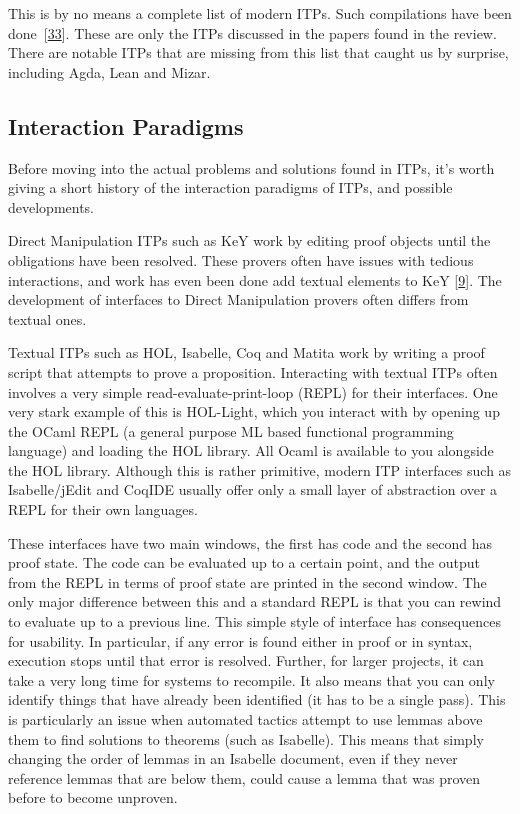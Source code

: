 \documentclass[
]{article}
\begin{document}
This is by no means a complete list of modern ITPs. Such compilations
have been done~{[}\protect\hyperlink{ref-nawaz_survey_2019}{33}{]}.
These are only the ITPs discussed in the papers found in the review.
There are notable ITPs that are missing from this list that caught us by
surprise, including Agda, Lean and Mizar.

\hypertarget{interaction-paradigms}{%
\subsection{Interaction Paradigms}\label{interaction-paradigms}}

Before moving into the actual problems and solutions found in ITPs, it's
worth giving a short history of the interaction paradigms of ITPs, and
possible developments.

Direct Manipulation ITPs such as KeY work by editing proof objects until
the obligations have been resolved. These provers often have issues with
tedious interactions, and work has even been done add textual elements
to KeY {[}\protect\hyperlink{ref-beckert_interaction_2017}{9}{]}. The
development of interfaces to Direct Manipulation provers often differs
from textual ones.

Textual ITPs such as HOL, Isabelle, Coq and Matita work by writing a
proof script that attempts to prove a proposition. Interacting with
textual ITPs often involves a very simple read-evaluate-print-loop
(REPL) for their interfaces. One very stark example of this is
HOL-Light, which you interact with by opening up the OCaml REPL (a
general purpose ML based functional programming language) and loading
the HOL library. All Ocaml is available to you alongside the HOL
library. Although this is rather primitive, modern ITP interfaces such
as Isabelle/jEdit and CoqIDE usually offer only a small layer of
abstraction over a REPL for their own languages.

These interfaces have two main windows, the first has code and the
second has proof state. The code can be evaluated up to a certain point,
and the output from the REPL in terms of proof state are printed in the
second window. The only major difference between this and a standard
REPL is that you can rewind to evaluate up to a previous line. This
simple style of interface has consequences for usability. In particular,
if any error is found either in proof or in syntax, execution stops
until that error is resolved. Further, for larger projects, it can take
a very long time for systems to recompile. It also means that you can
only identify things that have already been identified (it has to be a
single pass). This is particularly an issue when automated tactics
attempt to use lemmas above them to find solutions to theorems (such as
Isabelle). This means that simply changing the order of lemmas in an
Isabelle document, even if they never reference lemmas that are below
them, could cause a lemma that was proven before to become unproven.
\end{document}
